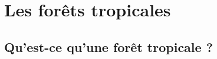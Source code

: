 \documentclass[10pt,table,dvipsnames,compress]{beamer}
\newif\ifplacelogo %
\begin{document}
\section{Les forêts tropicales}
\label{sec:orgf3edf9f}

\subsection{Qu'est-ce qu'une forêt tropicale ?}
\label{sec:org8cad0f5}
\end{document}
